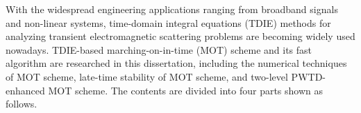 
\begin{englishabstract}
	With the widespread engineering applications ranging from broadband signals and non-linear systems, time-domain integral equations (TDIE) methods for analyzing transient electromagnetic scattering problems are becoming widely used nowadays. TDIE-based marching-on-in-time (MOT) scheme and its fast algorithm are researched in this dissertation, including the numerical techniques of MOT scheme, late-time stability of MOT scheme, and two-level PWTD-enhanced MOT scheme. The contents are divided into four parts shown as follows.
	
\end{englishabstract}


